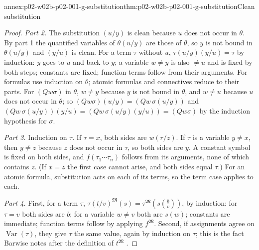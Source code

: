 \begin{annexitem}{annex:p02-w02b-p02-001-g-substitution}{thm:p02-w02b-p02-001-g-substitution}{Clean substitution}
\begin{proof}
\emph{Part 2.}  The substitution \((u/y)\) is clean because \(u\) does not
occur in \(\theta\).  By part 1 the quantified variables of \(\theta(u/y)\)
are those of \(\theta\), so \(y\) is not bound in \(\theta(u/y)\) and
\((y/u)\) is clean.  For a term \(\tau\) without \(u\),
\(\tau(u/y)(y/u)=\tau\) by induction: \(y\) goes to \(u\) and back to
\(y\); a variable \(w\neq y\) is also \(\neq u\) and is fixed by both steps;
constants are fixed; function terms follow from their arguments.  For
formulas use induction on \(\theta\); atomic formulas and connectives
reduce to their parts.  For \((Qw\sigma)\) in \(\theta\), \(w\neq y\)
because \(y\) is not bound in \(\theta\), and \(w\neq u\) because \(u\)
does not occur in \(\theta\); so \((Qw\sigma)(u/y)=(Qw\,\sigma(u/y))\) and
\((Qw\,\sigma(u/y))(y/u)=(Qw\,\sigma(u/y)(y/u))=(Qw\sigma)\) by the
induction hypothesis for \(\sigma\).

\emph{Part 3.}  Induction on \(\tau\).  If \(\tau=x\), both sides are
\(w(r/z)\).  If \(\tau\) is a variable \(y\neq x\), then \(y\neq z\)
because \(z\) does not occur in \(\tau\), so both sides are \(y\).  A
constant symbol is fixed on both sides, and \(f(\tau_1\cdots\tau_n)\)
follows from its arguments, none of which contains \(z\).  (If \(x=z\) the
first case cannot arise, and both sides equal \(\tau\).)  For an atomic
formula, substitution acts on each of its terms, so the term case applies
to each.

\emph{Part 4.}  First, for a term \(\tau\),
\(\tau(t/v)^{\mathfrak M}(s)=\tau^{\mathfrak M}(s(\tfrac bv))\), by
induction: for \(\tau=v\) both sides are \(b\); for a variable \(w\neq v\)
both are \(s(w)\); constants are immediate; function terms follow by
applying \(f^{\mathfrak M}\).  Second, if assignments agree on
\(\operatorname{Var}(\tau)\), they give \(\tau\) the same value, again by
induction on \(\tau\); this is the fact Barwise notes after the definition
of \(t^{\mathfrak M}\) \cite[ch.~A.1, \S3, p.~21]{Barwise1977FirstOrder}.


\end{proof}
\end{annexitem}
